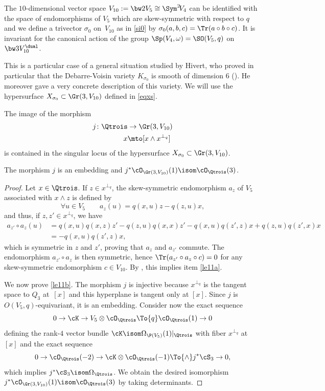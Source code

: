 The $10$-dimensional vector space
$V_{10}:=\bw2V_5\cong \Sym^2\!V_4$
can be identified with the space of endomorphisms of $V_5$ which are skew-symmetric with respect to $q$ and we define
a trivector $\sigma_0$ on~$ V_{10}$ as in \eqref{si0} by
$\sigma_0(a,b,c)=\Tr(a\circ b\circ c)
$. It is invariant for the canonical action of the group $\Sp(V_4,\omega) =\SO(V_5,q)$ on $\bw3V_{10}^\dual $.

This is a particular case of a general situation studied by Hivert, who proved in particular that the Debarre-Voisin variety
$K_{\sigma_0}$
is smooth of dimension 6 (\cite[Def.\,1.2 \& Th.\,4.1]{hivert}). He moreover gave a very concrete description of this variety. We will use the hypersurface $X_{\sigma_0}\subset \Gr(3,V_{10})$ defined in \eqref{eqxs}.

\skpt
\begin{prop} \label{le11}
\begin{enumeratea}
\item\label{le11a}
The image of the morphism
\begin{align*}
j\colon \Qtrois&\to \Gr(3,V_{10})\\
x&\mto[ x\wedge x^{\perp_q}]
\end{align*}
is contained in the singular locus of the hypersurface $X_{\sigma_0}\subset \Gr(3,V_{10})$.

\item\label{le11b}
The morphism $j$ is an embedding and $j^*\cO_{\Gr(3,V_{10})}(1)\isom \cO_{\Qtrois}(3)$.
\end{enumeratea}
\end{prop}

\begin{proof} Let $x\in \Qtrois$. If $z\in x^{\perp_q}$, the skew-symmetric endomorphism $a_z $ of $V_5$ associated with $x\wedge z$ is defined by
\[
\forall u\in V_5\qquad a_z(u)=q(x,u)z-q(z,u)x,
\]
and thus, if $z,z'\in x^{\perp_q}$, we have
\begin{align*}
a_{z'}\circ a_z (u)&=q(x,u)q(x,z)z'-q(z,u)q(x,x)z'-q(x,u)q(z',z )x+q(z,u)q(z',x)x\\
&=-q(x,u)q(z',z )x,
\end{align*}
which is symmetric in $z$ and $z'$,
proving that $ a_z$ and $ a_{z'}$ commute. The endomorphism
$ a_{z'}\circ a_z$ is then symmetric, hence $\Tr( a_{z'}\circ a_z\circ c)=0$ for any skew-symmetric endomorphism $c\in V_{10}$.
By \cite[Prop.\,3.1]{devo}, this implies item \eqref{le11a}.

We now prove \eqref{le11b}. The morphism $j$ is injective because $x^{\perp_q}$ is the tangent space to $Q_3$ at~$[x]$ and this hyperplane is tangent only at $[x]$. Since $j$ is $O(V_5,q)$-equivariant, it is an embedding. Consider now the exact sequence
\[\label{eqprem2611}
0 \to \cK \to V_5\otimes \cO_{\Qtrois}\To{q} \cO_{\Qtrois}(1)\to 0
\]
defining the rank-$4$ vector bundle $\cK \isom\Omega_{\P(V_5)}(1)\vert_\Qtrois$ with fiber $x^{\perp_q}$ at $[x]$ and the exact sequence
\[\label{eqdeux2611}
0\to \cO_{\Qtrois}(-2) \to \cK\otimes \cO_{\Qtrois}(-1)\To{\wedge} j^*\cS_3\to 0
,\]
which implies $j^*\cS_3\isom \Omega_\Qtrois$. We obtain the desired isomorphism $j^*\cO_{\Gr(3,V_{10})}(1)\isom \cO_{\Qtrois}(3)$ by taking determinants.
\end{proof}

